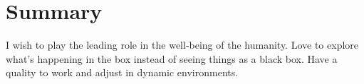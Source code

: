 \section{Summary}
I wish to play the leading role in the well-being of the humanity.
Love to explore what’s happening in the box instead of seeing
things as a black box. Have a quality to work and adjust in
dynamic environments.
